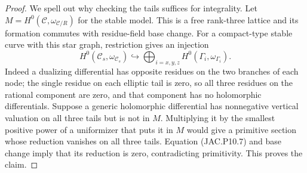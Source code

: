 \documentclass[11pt,a4paper]{article}
\begin{document}
\begin{proof}
We spell out why checking the tails suffices for integrality.
Let $M=H^0(\mathcal C,\omega_{\mathcal C/R})$ for the stable model.
This is a free rank-three lattice and its formation commutes with
residue-field base change. For a compact-type stable curve with
this star graph, restriction gives an injection
\[
 H^0(\mathcal C_s,\omega_{\mathcal C_s})
       \hookrightarrow\bigoplus_{i=x,y,z}
                           H^0(\Gamma_i,\omega_{\Gamma_i}).
                                                        \tag{JAC.P10.7}
\]
Indeed a dualizing differential has opposite residues on the two
branches of each node; the single residue on each elliptic tail
is zero, so all three residues on the rational component are zero,
and that component has no holomorphic differentials.
Suppose a generic holomorphic differential has nonnegative vertical
valuation on all three tails but is not in $M$. Multiplying it by
the smallest positive power of a uniformizer that puts it in $M$
would give a primitive section whose reduction vanishes on all
three tails. Equation (JAC.P10.7) and base change imply that its
reduction is zero, contradicting primitivity. This proves the claim.


\end{proof}
\end{document}
